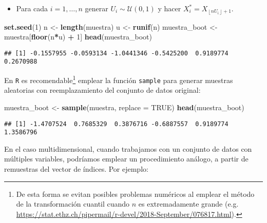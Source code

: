 \documentclass[]{book}
\newenvironment{Shaded}{\begin{snugshade}}{\end{snugshade}}
\newcommand{\KeywordTok}[1]{\textcolor[rgb]{0.13,0.29,0.53}{\textbf{#1}}}
\newcommand{\DataTypeTok}[1]{\textcolor[rgb]{0.13,0.29,0.53}{#1}}
\newcommand{\DecValTok}[1]{\textcolor[rgb]{0.00,0.00,0.81}{#1}}
\newcommand{\StringTok}[1]{\textcolor[rgb]{0.31,0.60,0.02}{#1}}
\newcommand{\OtherTok}[1]{\textcolor[rgb]{0.56,0.35,0.01}{#1}}
\newcommand{\OperatorTok}[1]{\textcolor[rgb]{0.81,0.36,0.00}{\textbf{#1}}}
\newcommand{\NormalTok}[1]{#1}
\providecommand{\tightlist}{%
  \setlength{\itemsep}{0pt}\setlength{\parskip}{0pt}}
\theoremstyle{break}
\theoremstyle{definition}
\theoremstyle{definition}
\theoremstyle{definition}
\theoremstyle{remark}
\begin{document}
\begin{itemize}
\tightlist
\item
  Para cada \(i=1,\ldots ,n\) generar
  \(U_i\sim \mathcal{U}\left( 0,1 \right)\) y hacer
  \(X_i^{\ast}=X_{\left\lfloor nU_i\right\rfloor +1}\).
\end{itemize}

\begin{Shaded}
\begin{Highlighting}[]
\KeywordTok{set.seed}\NormalTok{(}\DecValTok{1}\NormalTok{)}
\NormalTok{n <-}\StringTok{ }\KeywordTok{length}\NormalTok{(muestra)}
\NormalTok{u <-}\StringTok{ }\KeywordTok{runif}\NormalTok{(n)}
\NormalTok{muestra_boot <-}\StringTok{ }\NormalTok{muestra[}\KeywordTok{floor}\NormalTok{(n}\OperatorTok{*}\NormalTok{u) }\OperatorTok{+}\StringTok{ }\DecValTok{1}\NormalTok{]}
\KeywordTok{head}\NormalTok{(muestra_boot)}
\end{Highlighting}
\end{Shaded}

\begin{verbatim}
## [1] -0.1557955 -0.0593134 -1.0441346 -0.5425200  0.9189774  0.2670988
\end{verbatim}

En \texttt{R} es recomendable\footnote{De esta forma se evitan posibles
  problemas numéricos al emplear el método de la transformación cuantil
  cuando \(n\) es extremadamente grande (e.g.
  \url{https://stat.ethz.ch/pipermail/r-devel/2018-September/076817.html}).}
emplear la función \texttt{sample} para generar muestras aleatorias con
reemplazamiento del conjunto de datos original:

\begin{Shaded}
\begin{Highlighting}[]
\NormalTok{muestra_boot <-}\StringTok{ }\KeywordTok{sample}\NormalTok{(muestra, }\DataTypeTok{replace =} \OtherTok{TRUE}\NormalTok{)}
\KeywordTok{head}\NormalTok{(muestra_boot)}
\end{Highlighting}
\end{Shaded}

\begin{verbatim}
## [1] -1.4707524  0.7685329  0.3876716 -0.6887557  0.9189774  1.3586796
\end{verbatim}

En el caso multidimensional, cuando trabajamos con un conjunto de datos
con múltiples variables, podríamos emplear un procedimiento análogo, a
partir de remuestras del vector de índices. Por ejemplo:
\end{document}
